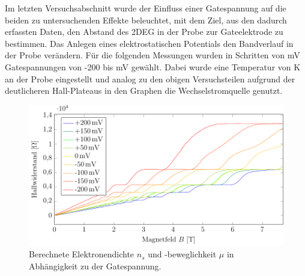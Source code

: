 
Im letzten Versuchsabschnitt wurde der Einfluss einer Gatespannung auf die beiden zu untersuchenden Effekte beleuchtet, mit dem Ziel, aus den dadurch erfassten Daten, den Abstand des 2DEG in der Probe zur Gateelektrode zu bestimmen.
Das Anlegen eines elektrostatischen Potentials den Bandverlauf in der Probe verändern.
Für die folgenden Messungen wurden in Schritten von \unit[50]{mV} Gatespannungen von -200 bis \unit[200]{mV} gewählt.
Dabei wurde eine Temperatur von \unit[2]{K} an der Probe eingestellt und analog zu den obigen Versuchsteilen aufgrund der deutlicheren Hall-Plateaus in den Graphen die Wechselstromquelle genutzt. 


\begin{figure}[h]
	\centering
	\includegraphics[scale=1]{graphs/gate/full_range.pdf}
	\caption[Auswertung der Gatespannungsvariation]{
		Berechnete Elektronendichte $n_s$ und -beweglichkeit $\mu$ in Abhängigkeit zu der Gatespannung.
	}
	\label{fig:gate_mess}
\end{figure}

